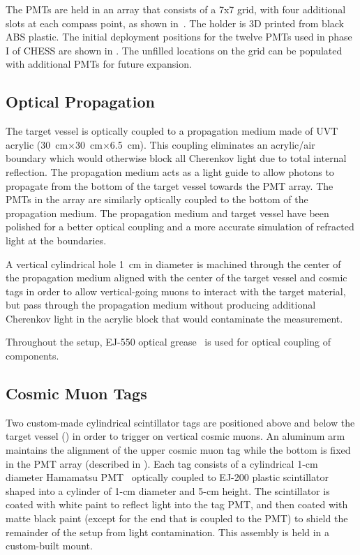 The PMTs are held in an array that consists of a 7x7 grid, with four additional slots at each compass point, as shown in~.  The holder is 3D printed from black ABS plastic.  The initial deployment positions for the twelve PMTs used in phase I of CHESS are shown in .
The unfilled locations on the grid can be populated with additional PMTs for future expansion. 

\subsection{Optical Propagation}
The target vessel is optically coupled to a propagation medium made of UVT acrylic (30~cm$\times$30~cm$\times$6.5~cm). This coupling eliminates an acrylic/air boundary which would otherwise block all Cherenkov light due to total internal reflection. The propagation medium acts as a light guide to allow photons to propagate from the bottom of the target vessel towards the PMT array. The PMTs in the array are similarly optically coupled to the bottom of the propagation medium. The propagation medium and target vessel have been polished for a better optical coupling and a more accurate simulation of refracted light at the boundaries. 

A vertical cylindrical hole 1~cm in diameter is machined through the center of the propagation medium aligned with the center of the target vessel and cosmic tags in order to allow  vertical-going  muons to interact with the target material, but pass through the propagation medium without producing additional Cherenkov light in the acrylic block that would contaminate the measurement.

Throughout the setup, EJ-550 optical grease~\cite{ej550} is used for optical coupling of components. 


\subsection{Cosmic Muon Tags}

Two custom-made cylindrical scintillator tags are positioned above and below the target vessel () in order to trigger on vertical cosmic muons.  An aluminum arm maintains the alignment of the upper cosmic muon tag while the bottom is fixed in the PMT array (described in ). Each tag consists of a cylindrical 1-cm diameter Hamamatsu PMT~\cite{h3164} optically coupled to EJ-200 plastic scintillator~\cite{ej200} shaped into a cylinder of 1-cm diameter and 5-cm height. The scintillator is coated with white paint to reflect light into the tag PMT, and then coated with matte black paint (except for the end that is coupled to the PMT) to shield the remainder of the setup from light contamination.  This assembly is held in a custom-built mount.

